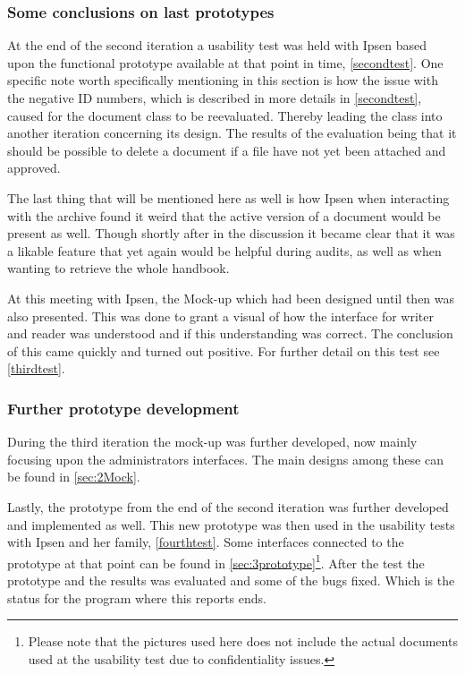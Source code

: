 \subsubsection*{Some conclusions on last prototypes}
At the end of the second iteration a usability test was held with Ipsen based upon the functional prototype available at that point in time, \cref{secondtest}.
One specific note worth specifically mentioning in this section is how the issue with the negative ID numbers, which is described in more details in \cref{secondtest}, caused for the document class to be reevaluated.
Thereby leading the class into another iteration concerning its design.
The results of the evaluation being that it should be possible to delete a document if a file have not yet been attached and approved.

The last thing that will be mentioned here as well is how Ipsen when interacting with the archive found it weird that the active version of a document would be present as well.
Though shortly after in the discussion it became clear that it was a likable feature that yet again would be helpful during audits, as well as when wanting to retrieve the whole handbook.

At this meeting with Ipsen, the Mock-up which had been designed until then was also presented.
This was done  to grant a visual of how the interface for writer and reader was understood and if this understanding was correct.
The conclusion of this came quickly and turned out positive.
For further detail on this test see \cref{thirdtest}.


\subsubsection*{Further prototype development}
During the third iteration the mock-up was further developed, now mainly focusing upon the administrators interfaces.
The main designs among these can be found in \cref{sec:2Mock}.

Lastly,  the prototype from the end of the second iteration was further developed and implemented as well.
This new prototype was then used in the usability tests with Ipsen and her family, \cref{fourthtest}.
Some interfaces connected to the prototype at that point can be found in \cref{sec:3prototype}\footnote{Please note that the pictures used here does not include the actual documents used at the usability test due to confidentiality issues.}.
After the test the prototype and the results was evaluated and some of the bugs fixed.
Which is the status for the program where this reports ends.
